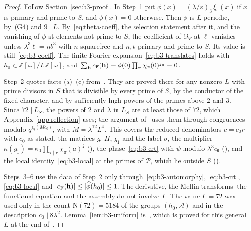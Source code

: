 \documentclass[11pt]{article}
\numberwithin{equation}{section}
\newcommand{\OO}{\mathbb Z[\omega]}
\newcommand{\N}{\mathrm N}
\begin{document}
\begin{proof}
Follow Section~\ref{sec:b3-proof}. In Step~1 put $\phi(x)=(\lambda/x)_3\,\xi_0(x)$ if $x$ is primary and prime
to $S$, and $\phi(x)=0$ otherwise. Then $\phi$ is $L$-periodic, by~(G4) and $9\mid L$. By~\eqref{eq:theta-coeff}, the selection
statement after it, and the vanishing of $\phi$ at elements not prime to $S$, the coefficient of
$\Theta_\Psi$ at $\ell$ vanishes unless $\lambda^3\ell=nb^3$ with $n$ squarefree and $n,b$ primary and prime
to $S$. Its value is still~\eqref{eq:b3-coeff}. The finite Fourier expansion~\eqref{eq:b3-translates} holds
with $h_0\in\OO/L\OO$, and $\sum_{\mathbf h}c_{\rm F}(\mathbf h)=\phi(0)\prod_\pi\chi_\pi(0)^{j_\pi}=0$.

Step~2 quotes facts (a)--(e) from~\cite[App.~A.2]{OAI1112}. They are proved there for any nonzero $L$ with
prime divisors in $S$ that is divisible by every prime of $S$, by the conductor of the fixed character, and
by sufficiently high powers of the primes above $2$ and $3$. Since $72\mid L_S$, the powers of $2$ and $\lambda$
in $L_S$ are at least those of $72$, which Appendix~\ref{app:reflection} uses; the argument of~\cite[App.~A.2]{OAI1112}
uses them through congruences modulo $q^{v_q(Mc_0)}$, with $M=\lambda^{12}L^4$. This covers the reduced denominators $c=c_0r$ with $c_0$ as stated, the matrices $g$, $H$,
$g_1$ and the label $\sigma$, the multiplier $\kappa(g_1)=\kappa_0\prod_{\pi\mid r}\chi_\pi(a)^2$
(\cite[(A.10)]{OAI1112}), the phase~\eqref{eq:b3-crt} with $\psi$ modulo $\lambda^3c_0$
(\cite[(A.11)]{OAI1112}), and the local identity~\eqref{eq:b3-local} at the primes of $\mathcal P$, which lie
outside $S$ (\cite[(A.12)]{OAI1112}).

Steps~3--6 use the data of Step~2 only through~\eqref{eq:b3-automorphy}, \eqref{eq:b3-crt},
\eqref{eq:b3-local} and $|c_{\rm F}(\mathbf h)|\le|\widehat\phi(h_0)|\le1$. The derivative, the Mellin
transforms, the functional equation and the assembly do not involve $L$. The value $L=72$ was used only in
the count $\N(72)=5184$ of the groups $(h_0,\mathcal A)$ and in the description $c_0\mid8\lambda^2$.
Lemma~\ref{lem:b3-uniform} is~\cite[Lemma~6.3]{OAI1112}, which is proved for this general $L$ at the end
of~\cite[App.~A.2]{OAI1112}.
\end{proof}
\end{document}
